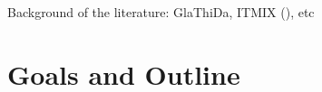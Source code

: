 %
%

Background of the literature: GlaThiDa, ITMIX (\citet{Farinotti2017}), etc 


\section{Goals and Outline}\label{goals}

